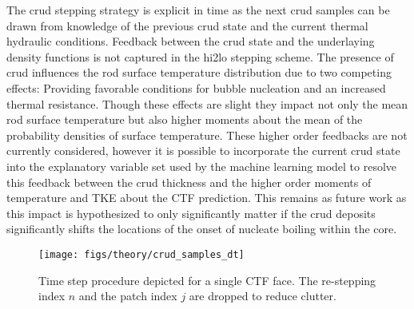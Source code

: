 The crud stepping strategy is explicit in time as the next crud samples can be drawn from knowledge of the previous crud state and the current thermal hydraulic conditions.  Feedback between the crud state and the underlaying density functions is not captured in the hi2lo stepping scheme.  The presence of crud influences the rod surface temperature distribution due to two competing effects: Providing favorable conditions for bubble nucleation and an increased thermal resistance.  Though these effects are slight they impact not only the mean rod surface temperature but also higher moments about the mean of the probability densities of surface temperature.  These higher order feedbacks are not currently considered, however it is possible to incorporate the current crud state into the explanatory variable set used by the machine learning model to resolve this feedback between the crud thickness and the higher order moments of temperature and TKE about the CTF prediction.  This remains as future work as this impact is hypothesized to only significantly matter if the crud deposits significantly shifts the locations of the onset of nucleate boiling within the core.

\begin{figure}[H]
    \centering
    \texttt{[image: figs/theory/crud\_samples\_dt]}
    \caption[Time step procedure depicted for a single CTF face]{Time step procedure depicted for a single CTF face.  The re-stepping index $n$ and the patch index $j$ are dropped to reduce clutter.}
    \label{fig:crudsamplesdt}
\end{figure}


